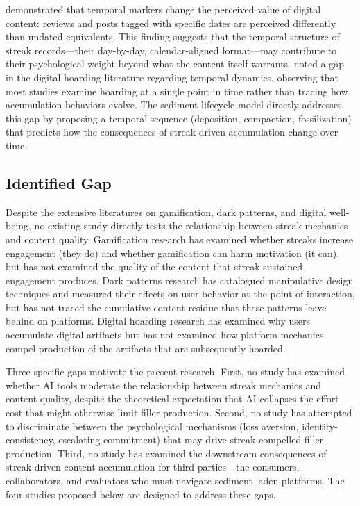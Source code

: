 \documentclass[12pt]{article}
\begin{document}
\citet{Hagen2025} demonstrated that temporal markers change the perceived value of digital content: reviews and posts tagged with specific dates are perceived differently than undated equivalents. This finding suggests that the temporal structure of streak records---their day-by-day, calendar-aligned format---may contribute to their psychological weight beyond what the content itself warrants. \citet{Zhang2025} noted a gap in the digital hoarding literature regarding temporal dynamics, observing that most studies examine hoarding at a single point in time rather than tracing how accumulation behaviors evolve. The sediment lifecycle model directly addresses this gap by proposing a temporal sequence (deposition, compaction, fossilization) that predicts how the consequences of streak-driven accumulation change over time.

\subsection{Identified Gap}
\label{sec:identified-gap}

Despite the extensive literatures on gamification, dark patterns, and digital well-being, no existing study directly tests the relationship between streak mechanics and content quality. Gamification research has examined whether streaks increase engagement (they do) and whether gamification can harm motivation (it can), but has not examined the quality of the content that streak-sustained engagement produces. Dark patterns research has catalogued manipulative design techniques and measured their effects on user behavior at the point of interaction, but has not traced the cumulative content residue that these patterns leave behind on platforms. Digital hoarding research has examined why users accumulate digital artifacts but has not examined how platform mechanics compel production of the artifacts that are subsequently hoarded.

Three specific gaps motivate the present research. First, no study has examined whether AI tools moderate the relationship between streak mechanics and content quality, despite the theoretical expectation that AI collapses the effort cost that might otherwise limit filler production. Second, no study has attempted to discriminate between the psychological mechanisms (loss aversion, identity-consistency, escalating commitment) that may drive streak-compelled filler production. Third, no study has examined the downstream consequences of streak-driven content accumulation for third parties---the consumers, collaborators, and evaluators who must navigate sediment-laden platforms. The four studies proposed below are designed to address these gaps.
\end{document}
